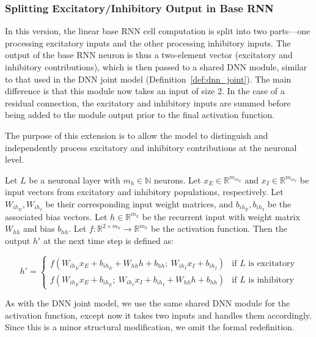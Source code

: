 \subsubsection{Splitting Excitatory/Inhibitory Output in Base RNN}
\label{subsubsec:dnn_separate}
In this version, the linear base RNN cell computation is split into two parts—one processing excitatory inputs and the other processing inhibitory inputs. The output of the base RNN neuron is thus a two-element vector (excitatory and inhibitory contributions), which is then passed to a shared DNN module, similar to that used in the DNN joint model (Definition~\ref{def:dnn_joint}). The main difference is that this module now takes an input of size 2. In the case of a residual connection, the excitatory and inhibitory inputs are summed before being added to the module output prior to the final activation function.

The purpose of this extension is to allow the model to distinguish and independently process excitatory and inhibitory contributions at the neuronal level.

\begin{defn}
Let $L$ be a neuronal layer with $m_h \in \mathbb{N}$ neurons. Let $x_E \in \mathbb{R}^{m_{in_E}}$ and $x_I \in \mathbb{R}^{m_{in_I}}$ be input vectors from excitatory and inhibitory populations, respectively. Let $W_{ih_E}, W_{ih_I}$ be their corresponding input weight matrices, and $b_{ih_E}, b_{ih_I}$ be the associated bias vectors. Let $h \in \mathbb{R}^{m_h}$ be the recurrent input with weight matrix $W_{hh}$ and bias $b_{hh}$. Let $f: \mathbb{R}^{2 \times m_h} \to \mathbb{R}^{m_h}$ be the activation function. Then the output $h'$ at the next time step is defined as:

\begin{equation*}
    h' = 
    \begin{cases}
        f\left(W_{ih_E}x_E + b_{ih_E} + W_{hh}h + b_{hh};\ W_{ih_I}x_I + b_{ih_I}\right) & \text{if $L$ is excitatory} \\
        f\left(W_{ih_E}x_E + b_{ih_E};\ W_{ih_I}x_I + b_{ih_I} + W_{hh}h + b_{hh}\right) & \text{if $L$ is inhibitory}
    \end{cases}
\end{equation*}
\end{defn}
\label{def:separate_base_rnn}

As with the DNN joint model, we use the same shared DNN module for the activation function, except now it takes two inputs and handles them accordingly. Since this is a minor structural modification, we omit the formal redefinition.

